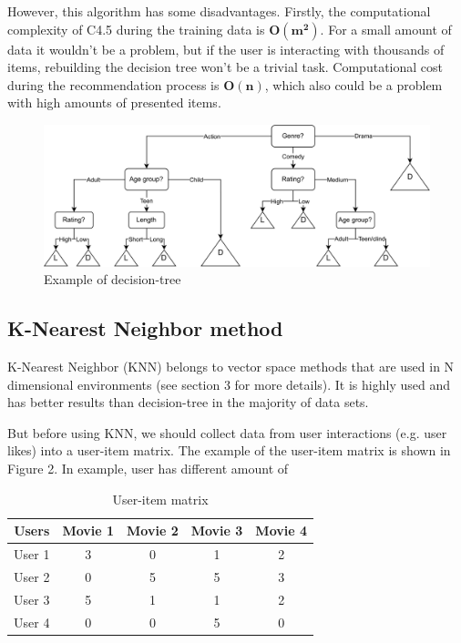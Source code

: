 However, this algorithm has some disadvantages. Firstly, the computational complexity of C4.5 during the training data is $\mathbf{O(m^2)}$. For a small amount of data it wouldn't be a problem, but if the user is interacting with thousands of items, rebuilding the decision tree won't be a trivial task. Computational cost during the recommendation process is $\mathbf{O(n)}$, which also could be a problem with high amounts of presented items\cite{Decision_Tree}.
\begin{center}
    \begin{figure}[H]
    \includegraphics[width=\textwidth]{figures/diagrams/article_decision_tree.pdf}
    \caption{Example of decision-tree}
    \label{fig:decision_tree}
    \end{figure}
\end{center}

\subsection{K-Nearest Neighbor method}
K-Nearest Neighbor (KNN) belongs to vector space methods that are used in N dimensional environments (see section 3 for more details). It is highly used and has better results than decision-tree in the majority of data sets\cite{KNN}.

But before using KNN, we should collect data from user interactions (e.g. user likes) into a user-item matrix. The example of the user-item matrix is shown in Figure 2. In example, user has different amount of 

\begin{table}[h]
    \centering
    \begin{tabular}{|c|c|c|c|c|}
        \hline
        \textbf{Users} & \textbf{Movie 1} & \textbf{Movie 2} & \textbf{Movie 3} & \textbf{Movie 4} \\        
        \hline
        User 1 & 3 & 0 & 1 & 2\\
        \hline
        User 2 & 0 & 5 & 5 & 3\\
        \hline
        User 3 & 5 & 1 & 1 & 2\\
        \hline
        User 4 & 0 & 0 & 5 & 0\\
        \hline
    \end{tabular}
    \caption{User-item matrix}\label{tab:user_item_matrix}
\end{table}

